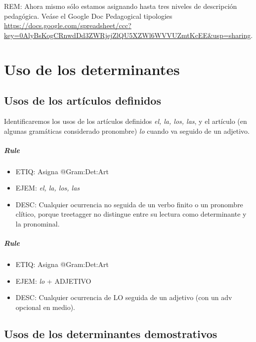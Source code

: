 \documentclass[11pt]{report}
\begin{document}
REM: Ahora mismo sólo estamos asignando hasta tres niveles de descripción pedagógica. Veáse el Google Doc Pedagogical tipologies \url{https://docs.google.com/spreadsheet/ccc?key=0AlyBsKogCRnwdDd3ZWRjejZlQU5XZWl6WVVUZmtKcEE&usp=sharing}.
\chapter{Uso de los determinantes}
\section{Usos de los artículos definidos}
Identificaremos los usos de los artículos definidos \emph{el, la, los, las}, y el artículo (en algunas gramáticas considerado pronombre) \emph{lo} cuando va seguido de un adjetivo.

\paragraph*{Rule}
\begin{itemize}
\item ETIQ: Asigna @Gram:Det:Art
\item EJEM: \emph{el, la, los, las}
\item DESC: Cualquier ocurrencia no seguida de un verbo finito o un pronombre clítico, porque treetagger no distingue entre su lectura como determinante y la pronominal.
\end{itemize}

\paragraph*{Rule}
\begin{itemize}
\item ETIQ: Asigna @Gram:Det:Art
\item EJEM: \emph{lo} + ADJETIVO
\item DESC: Cualquier ocurrencia de LO seguida de un adjetivo (con un adv opcional en medio).
\end{itemize}

\section{Usos de los determinantes demostrativos}
\end{document}
